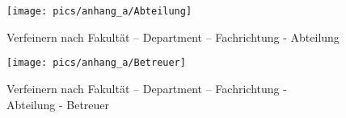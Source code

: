 \begin{figure}[hp]%
    \centering
    \texttt{[image: pics/anhang\_a/Abteilung]}\\
    \caption{Verfeinern nach Fakultät – Department – Fachrichtung - Abteilung}
\end{figure}
\cleardoublepage

\begin{figure}[hp]%
    \centering
    \texttt{[image: pics/anhang\_a/Betreuer]}\\
    \caption{Verfeinern nach Fakultät – Department – Fachrichtung - \\Abteilung - Betreuer}
\end{figure}
